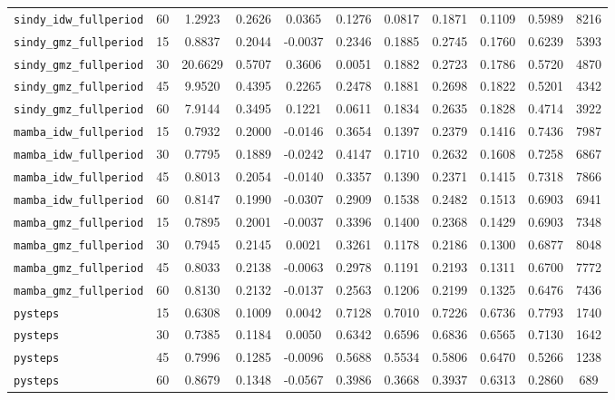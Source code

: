 \documentclass[12pt, a4paper]{article}
\begin{document}
{\begin{longtable}{p{4.0cm}cccccccccc}
\texttt{sindy\_idw\_fullperiod} & 60 & 1.2923 & 0.2626 & 0.0365 & 0.1276 & 0.0817 & 0.1871 & 0.1109 & 0.5989 & 8216 \\
\addlinespace[1pt]
\texttt{sindy\_gmz\_fullperiod} & 15 & 0.8837 & 0.2044 & -0.0037 & 0.2346 & 0.1885 & 0.2745 & 0.1760 & 0.6239 & 5393 \\
\texttt{sindy\_gmz\_fullperiod} & 30 & 20.6629 & 0.5707 & 0.3606 & 0.0051 & 0.1882 & 0.2723 & 0.1786 & 0.5720 & 4870 \\
\texttt{sindy\_gmz\_fullperiod} & 45 & 9.9520 & 0.4395 & 0.2265 & 0.2478 & 0.1881 & 0.2698 & 0.1822 & 0.5201 & 4342 \\
\texttt{sindy\_gmz\_fullperiod} & 60 & 7.9144 & 0.3495 & 0.1221 & 0.0611 & 0.1834 & 0.2635 & 0.1828 & 0.4714 & 3922 \\
\addlinespace[1pt]
\texttt{mamba\_idw\_fullperiod} & 15 & 0.7932 & 0.2000 & -0.0146 & 0.3654 & 0.1397 & 0.2379 & 0.1416 & 0.7436 & 7987 \\
\texttt{mamba\_idw\_fullperiod} & 30 & 0.7795 & 0.1889 & -0.0242 & 0.4147 & 0.1710 & 0.2632 & 0.1608 & 0.7258 & 6867 \\
\texttt{mamba\_idw\_fullperiod} & 45 & 0.8013 & 0.2054 & -0.0140 & 0.3357 & 0.1390 & 0.2371 & 0.1415 & 0.7318 & 7866 \\
\texttt{mamba\_idw\_fullperiod} & 60 & 0.8147 & 0.1990 & -0.0307 & 0.2909 & 0.1538 & 0.2482 & 0.1513 & 0.6903 & 6941 \\
\addlinespace[1pt]
\texttt{mamba\_gmz\_fullperiod} & 15 & 0.7895 & 0.2001 & -0.0037 & 0.3396 & 0.1400 & 0.2368 & 0.1429 & 0.6903 & 7348 \\
\texttt{mamba\_gmz\_fullperiod} & 30 & 0.7945 & 0.2145 & 0.0021 & 0.3261 & 0.1178 & 0.2186 & 0.1300 & 0.6877 & 8048 \\
\texttt{mamba\_gmz\_fullperiod} & 45 & 0.8033 & 0.2138 & -0.0063 & 0.2978 & 0.1191 & 0.2193 & 0.1311 & 0.6700 & 7772 \\
\texttt{mamba\_gmz\_fullperiod} & 60 & 0.8130 & 0.2132 & -0.0137 & 0.2563 & 0.1206 & 0.2199 & 0.1325 & 0.6476 & 7436 \\
\addlinespace[1pt]
\texttt{pysteps} & 15 & 0.6308 & 0.1009 & 0.0042 & 0.7128 & 0.7010 & 0.7226 & 0.6736 & 0.7793 & 1740 \\
\texttt{pysteps} & 30 & 0.7385 & 0.1184 & 0.0050 & 0.6342 & 0.6596 & 0.6836 & 0.6565 & 0.7130 & 1642 \\
\texttt{pysteps} & 45 & 0.7996 & 0.1285 & -0.0096 & 0.5688 & 0.5534 & 0.5806 & 0.6470 & 0.5266 & 1238 \\
\texttt{pysteps} & 60 & 0.8679 & 0.1348 & -0.0567 & 0.3986 & 0.3668 & 0.3937 & 0.6313 & 0.2860 & 689 \\
\end{longtable}
}
\end{document}
